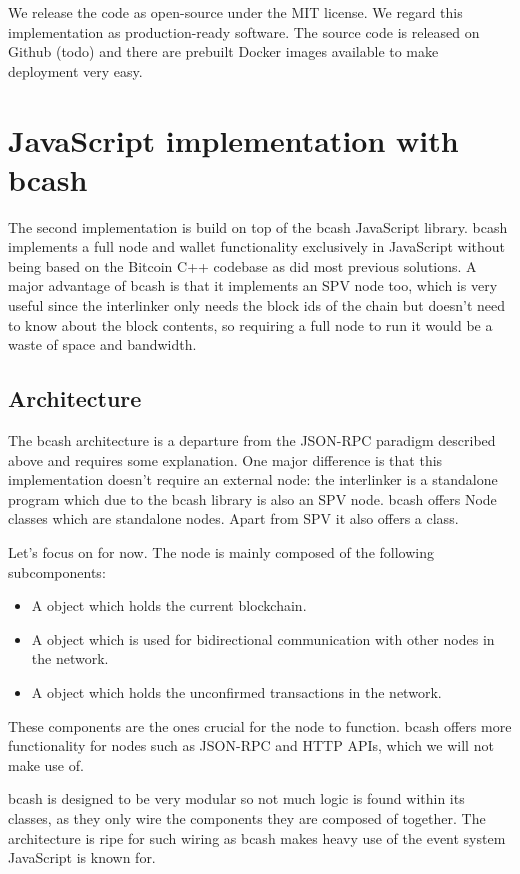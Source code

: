 We release the code as open-source under the MIT license. We regard this implementation as production-ready software. The source code is released on Github (todo) and there are prebuilt Docker images available to make deployment very easy.

\section{JavaScript implementation with bcash}
The second implementation is build on top of the bcash JavaScript library. bcash implements a full node and wallet functionality exclusively in JavaScript without being based on the Bitcoin C++ codebase as did most previous solutions. A major advantage of bcash is that it implements an SPV node too, which is very useful since the interlinker only needs the block ids of the chain but doesn't need to know about the block contents, so requiring a full node to run it would be a waste of space and bandwidth.

\subsection{Architecture}
The bcash architecture is a departure from the JSON-RPC paradigm described above and requires some explanation. One major difference is that this implementation doesn't require an external node: the interlinker is a standalone program which due to the bcash library is also an SPV node. bcash offers Node classes which are standalone nodes. Apart from SPV it also offers a  class.

Let's focus on  for now. The node is mainly composed of the following subcomponents:

\begin{itemize}
  \item A  object which holds the current blockchain.
  \item A  object which is used for bidirectional communication with other nodes in the network.
  \item A  object which holds the unconfirmed transactions in the network.
\end{itemize}

These components are the ones crucial for the node to function. bcash offers more functionality for nodes such as JSON-RPC and HTTP APIs, which we will not make use of.

bcash is designed to be very modular so not much logic is found within its  classes, as they only wire the components they are composed of together. The architecture is ripe for such wiring as bcash makes heavy use of the event system JavaScript is known for.

